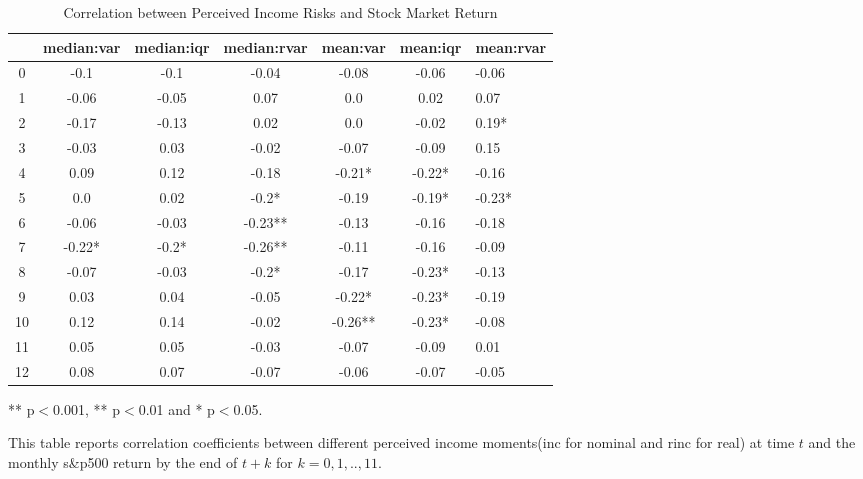 \begin{table}[ht]
\centering
\begin{adjustbox}{width={\textwidth}}
\begin{threeparttable}
\caption{Correlation between Perceived Income Risks and Stock Market Return}
\label{macro_corr}
\begin{tabular}{ccccccl}
\toprule
{} & median:var & median:iqr & median:rvar & mean:var & mean:iqr & mean:rvar \\
\midrule
0  &       -0.1 &       -0.1 &       -0.04 &    -0.08 &    -0.06 &     -0.06 \\
1  &      -0.06 &      -0.05 &        0.07 &      0.0 &     0.02 &      0.07 \\
2  &      -0.17 &      -0.13 &        0.02 &      0.0 &    -0.02 &     0.19* \\
3  &      -0.03 &       0.03 &       -0.02 &    -0.07 &    -0.09 &      0.15 \\
4  &       0.09 &       0.12 &       -0.18 &   -0.21* &   -0.22* &     -0.16 \\
5  &        0.0 &       0.02 &       -0.2* &    -0.19 &   -0.19* &    -0.23* \\
6  &      -0.06 &      -0.03 &     -0.23** &    -0.13 &    -0.16 &     -0.18 \\
7  &     -0.22* &      -0.2* &     -0.26** &    -0.11 &    -0.16 &     -0.09 \\
8  &      -0.07 &      -0.03 &       -0.2* &    -0.17 &   -0.23* &     -0.13 \\
9  &       0.03 &       0.04 &       -0.05 &   -0.22* &   -0.23* &     -0.19 \\
10 &       0.12 &       0.14 &       -0.02 &  -0.26** &   -0.23* &     -0.08 \\
11 &       0.05 &       0.05 &       -0.03 &    -0.07 &    -0.09 &      0.01 \\
12 &       0.08 &       0.07 &       -0.07 &    -0.06 &    -0.07 &     -0.05 \\
\bottomrule
\end{tabular}
\begin{tablenotes}
\item *** p$<$0.001, ** p$<$0.01 and * p$<$0.05.
\item This table reports correlation coefficients between different perceived income moments(inc for nominal
and rinc for real) at time
$t$ and the monthly s\&p500 return by the end of $t+k$ for $k=0,1,..,11$.
\end{tablenotes}
\end{threeparttable}
\end{adjustbox}
\end{table}
\clearpage

